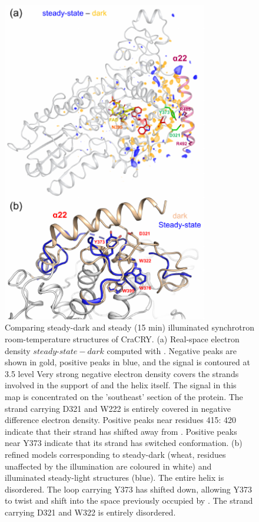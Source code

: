 \begin{figure}[H]
  \centering
  \includegraphics[width=0.8\textwidth]{images/cracry/light-dark_MX.pdf}
  \hfill
  \caption{Comparing steady-dark and steady (15 min) illuminated synchrotron room-temperature structures of CraCRY. (a) Real-space electron density \(steady\mbox{-}state - dark\) computed with \cite{brooknerMatchMapsNonisomorphousDifference2024}. Negative peaks are shown in gold, positive peaks in blue, and the signal is contoured at 3.5 \textsigma level Very strong negative electron density covers the strands involved in the support of  and the helix itself. The signal in this map is concentrated on the 'southeast' section of the protein.  The strand carrying D321 and W222 is entirely covered in negative difference electron density. Positive peaks near residues 415: 420 indicate that their strand has shifted away from . Positive peaks near Y373 indicate that its strand has switched conformation. (b) refined models corresponding to steady-dark (wheat, residues unaffected by the illumination are coloured in white) and illuminated steady-light structures (blue). The entire  helix is disordered. The loop carrying Y373 has shifted down, allowing Y373 to twist and shift into the space previously occupied by . The strand carrying D321 and W322 is entirely disordered.}\label{fig:TR-SOX_ligh_dark_steady_CraCRY}
\end{figure}


